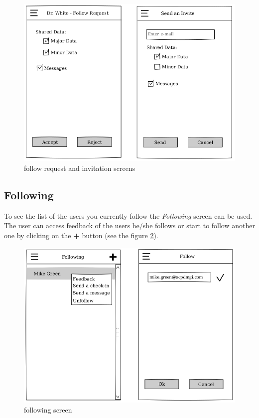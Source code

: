 \documentclass{article}
\begin{document}
    \begin{figure}[h]
        \centering
        \includegraphics[width=\textwidth,height=\textheight,keepaspectratio]{follow_req.png}
        \caption{follow request and invitation screens}
        \label{fig:screen_follow_req}
    \end{figure}

\newpage

    \subsection{Following}

    To see the list of the users you currently follow the \emph{Following} screen can be used. The user can access feedback of the users he/she follows or start to follow another one by clicking on the \textbf{+} button (see the figure \ref{fig:screen_following}).

    \begin{figure}[h]
        \centering
        \includegraphics[width=\textwidth,height=\textheight,keepaspectratio]{following.png}
        \caption{following screen}
        \label{fig:screen_following}
    \end{figure}
\end{document}
